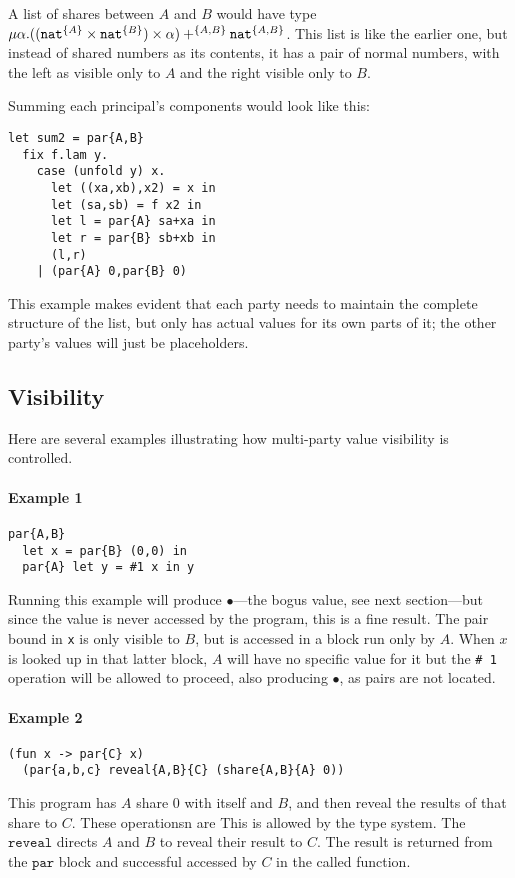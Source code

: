 \documentclass[10pt]{article}
\newcommand{\kw}[1]{\ensuremath{\mathtt{#1}}}
\newcommand{\tnat}{\ensuremath{\mathtt{nat}}}
\newcommand{\tpair}[2]{\ensuremath{{#1} \times {#2}}}
\newcommand{\tsum}[3]{\ensuremath{{#1} +^{#3} {#2}}}
\newcommand{\trec}[2]{\ensuremath{\mu {#1}.{#2}}}
\newcommand{\vcrash}{\ensuremath{\bullet}}
\begin{document}
A list of shares between $A$ and $B$ would have type
$\trec{\alpha}{\tsum{(\tpair{(\tpair{\tnat^{\{A\}}}{\tnat^{\{B\}}})}{\alpha})}{\tnat^{\twoprins}}{\twoprins}}$.
This list is like the earlier one, but instead of shared numbers as
its contents, it has a pair of normal numbers, with the left as
visible only to $A$ and the right visible only to $B$.

Summing each principal's components would look like this:
\begin{verbatim}
let sum2 = par{A,B}
  fix f.lam y.
    case (unfold y) x.
      let ((xa,xb),x2) = x in
      let (sa,sb) = f x2 in
      let l = par{A} sa+xa in
      let r = par{B} sb+xb in
      (l,r)
    | (par{A} 0,par{B} 0)
\end{verbatim}
This example makes evident that each party needs to maintain the
complete structure of the list, but only has actual values for its own
parts of it; the other party's values will just be placeholders.

\subsection{Visibility}
\label{sec:vis}

Here are several examples illustrating how multi-party value
visibility is controlled.

\paragraph{Example 1}
\begin{verbatim}
par{A,B}
  let x = par{B} (0,0) in
  par{A} let y = #1 x in y
\end{verbatim}
Running this example will produce $\vcrash$---the bogus value, see
next section---but since the value is never accessed by the program,
this is a fine result. The pair bound in \texttt{x} is only visible to
$B$, but is accessed in a block run only by $A$. When $x$ is looked up
in that latter block, $A$ will have no specific value for it but the
\texttt{\# 1} operation will be allowed to proceed, also producing
$\vcrash$, as pairs are not located.

\paragraph{Example 2}
\begin{verbatim}
(fun x -> par{C} x) 
  (par{a,b,c} reveal{A,B}{C} (share{A,B}{A} 0))
\end{verbatim}
This program has $A$ share $0$ with itself and $B$, and then reveal
the results of that share to $C$. These operationsn are 
This is allowed by the type system. The $\kw{reveal}$ directs $A$ and
$B$ to reveal their result to $C$. The result is returned from the
$\kw{par}$ block and successful accessed by $C$ in the called function.
\end{document}
